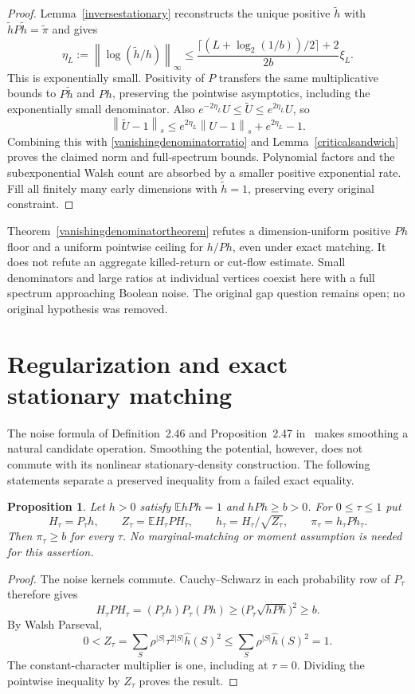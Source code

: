 \documentclass[11pt]{article}
\newcommand{\E}{\mathbb E}
\newcommand{\norm}[1]{\left\|#1\right\|}
\newtheorem{proposition}[theorem]{Proposition}
\begin{document}
\begin{proof}
Lemma~\ref{inversestationary} reconstructs the unique positive
$\widetilde h$ with $\widetilde hP\widetilde h=\widetilde\pi$ and gives
\[
 \eta_L:=\norm{\log(\widetilde h/h)}_\infty
 \leq\frac{\lceil(L+\log_2(1/b))/2\rceil+2}{2b}\xi_L.
\]
This is exponentially small. Positivity of $P$ transfers the same
multiplicative bounds to $P\widetilde h$ and $Ph$, preserving the
pointwise asymptotics, including the exponentially small denominator.
Also $e^{-2\eta_L}U\leq\widetilde U\leq e^{2\eta_L}U$, so
\[
 \norm{\widetilde U-1}_s
 \leq e^{2\eta_L}\norm{U-1}_s+e^{2\eta_L}-1.
\]
Combining this with \eqref{vanishingdenominatorratio} and
Lemma~\ref{criticalsandwich} proves the claimed norm and full-spectrum
bounds. Polynomial factors and the subexponential Walsh count are absorbed
by a smaller positive exponential rate. Fill all finitely many early
dimensions with $\widetilde h=1$, preserving every original constraint.
\end{proof}

Theorem~\ref{vanishingdenominatortheorem} refutes a dimension-uniform
positive $Ph$ floor and a uniform pointwise ceiling for $h/Ph$, even
under exact matching. It does not refute an aggregate killed-return or
cut-flow estimate. Small denominators and large ratios at individual
vertices coexist here with a full spectrum approaching Boolean noise.
The original gap question remains open; no original hypothesis was removed.

\section{Regularization and exact stationary matching}\label{regularization}
The noise formula of Definition~2.46 and Proposition~2.47
in~\cite{odonnell} makes smoothing a natural candidate operation.
Smoothing the potential, however, does not commute with its nonlinear
stationary-density construction. The following statements separate a
preserved inequality from a failed exact equality.

\begin{proposition}\label{smoothingfloor}
Let $h>0$ satisfy $\E hPh=1$ and $hPh\geq b>0$. For $0\leq\tau\leq1$ put
\[
 H_\tau=P_\tau h,\qquad Z_\tau=\E H_\tau P H_\tau,\qquad
 h_\tau=H_\tau/\sqrt{Z_\tau},\qquad \pi_\tau=h_\tau P h_\tau.
\]
Then $\pi_\tau\geq b$ for every $\tau$. No marginal-matching or moment
assumption is needed for this assertion.
\end{proposition}
\begin{proof}
The noise kernels commute. Cauchy--Schwarz in each probability row of
$P_\tau$ therefore gives
\[
 H_\tau P H_\tau=(P_\tau h)P_\tau(Ph)
 \geq\bigl(P_\tau\sqrt{hPh}\bigr)^2\geq b.
\]
By Walsh Parseval,
\[
 0<Z_\tau=\sum_S\rho^{|S|}\tau^{2|S|}\widehat h(S)^2
 \leq\sum_S\rho^{|S|}\widehat h(S)^2=1.
\]
The constant-character multiplier is one, including at $\tau=0$.
Dividing the pointwise inequality by $Z_\tau$ proves the result.
\end{proof}
\end{document}

